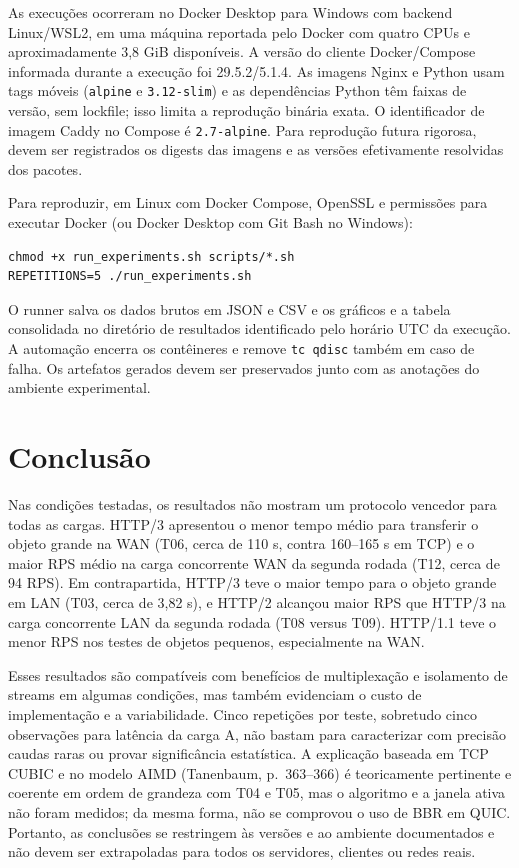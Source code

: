 \documentclass[12pt,a4paper]{article}
\begin{document}
As execuções ocorreram no Docker Desktop para Windows com backend Linux/WSL2, em uma
máquina reportada pelo Docker com quatro CPUs e aproximadamente 3,8 GiB disponíveis. A
versão do cliente Docker/Compose informada durante a execução foi 29.5.2/5.1.4. As imagens
Nginx e Python usam tags móveis (\texttt{alpine} e \texttt{3.12-slim}) e as dependências
Python têm faixas de versão, sem lockfile; isso limita a reprodução binária exata. O
identificador de imagem Caddy no Compose é \texttt{2.7-alpine}. Para reprodução futura
rigorosa, devem ser registrados os digests das imagens e as versões efetivamente resolvidas
dos pacotes.

Para reproduzir, em Linux com Docker Compose, OpenSSL e permissões para executar Docker
(ou Docker Desktop com Git Bash no Windows):
\begin{verbatim}
chmod +x run_experiments.sh scripts/*.sh
REPETITIONS=5 ./run_experiments.sh
\end{verbatim}

O runner salva os dados brutos em JSON e CSV e os gráficos e a tabela consolidada no
diretório de resultados identificado pelo horário UTC da execução. A automação encerra os
contêineres e remove \texttt{tc qdisc} também em caso de falha. Os artefatos gerados devem
ser preservados junto com as anotações do ambiente experimental.

\section{Conclusão}

Nas condições testadas, os resultados não mostram um protocolo vencedor para todas as cargas.
HTTP/3 apresentou o menor tempo médio para transferir o objeto grande na WAN (T06, cerca de
110 s, contra 160--165 s em TCP) e o maior RPS médio na carga concorrente WAN da segunda
rodada (T12, cerca de 94 RPS). Em contrapartida, HTTP/3 teve o maior tempo para o objeto
grande em LAN (T03, cerca de 3,82 s), e HTTP/2 alcançou maior RPS que HTTP/3 na carga
concorrente LAN da segunda rodada (T08 versus T09). HTTP/1.1 teve o menor RPS nos testes
de objetos pequenos, especialmente na WAN.

Esses resultados são compatíveis com benefícios de multiplexação e isolamento de streams em
algumas condições, mas também evidenciam o custo de implementação e a variabilidade. Cinco
repetições por teste, sobretudo cinco observações para latência da carga A, não bastam para
caracterizar com precisão caudas raras ou provar significância estatística. A explicação
baseada em TCP CUBIC e no modelo AIMD (Tanenbaum, p.~363--366) é teoricamente pertinente
e coerente em ordem de grandeza com T04 e T05, mas o algoritmo e a janela ativa não foram
medidos; da mesma forma, não se comprovou o uso de BBR em QUIC. Portanto, as conclusões
se restringem às versões e ao ambiente documentados e não devem ser extrapoladas para todos
os servidores, clientes ou redes reais.
\end{document}
